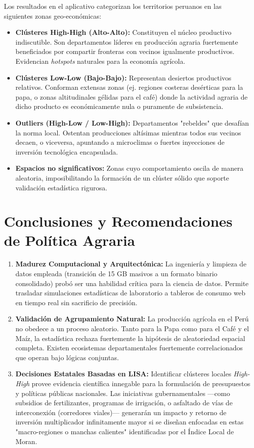 \documentclass[12pt,a4paper]{article}
\begin{document}
Los resultados en el aplicativo categorizan los territorios peruanos en las siguientes zonas geo-económicas:
\begin{itemize}
    \item \textbf{Clústeres High-High (Alto-Alto):} Constituyen el núcleo productivo indiscutible. Son departamentos líderes en producción agraria fuertemente beneficiados por compartir fronteras con vecinos igualmente productivos. Evidencian \textit{hotspots} naturales para la economía agrícola.
    \item \textbf{Clústeres Low-Low (Bajo-Bajo):} Representan desiertos productivos relativos. Conforman extensas zonas (ej. regiones costeras desérticas para la papa, o zonas altitudinales gélidas para el café) donde la actividad agraria de dicho producto es económicamente nula o puramente de subsistencia.
    \item \textbf{Outliers (High-Low / Low-High):} Departamentos "rebeldes" que desafían la norma local. Ostentan producciones altísimas mientras todos sus vecinos decaen, o viceversa, apuntando a microclimas o fuertes inyecciones de inversión tecnológica encapsulada.
    \item \textbf{Espacios no significativos:} Zonas cuyo comportamiento oscila de manera aleatoria, imposibilitando la formación de un clúster sólido que soporte validación estadística rigurosa.
\end{itemize}

\section{Conclusiones y Recomendaciones de Política Agraria}
\begin{enumerate}
    \item \textbf{Madurez Computacional y Arquitectónica:} La ingeniería y limpieza de datos empleada (transición de 15 GB masivos a un formato binario consolidado) probó ser una habilidad crítica para la ciencia de datos. Permite trasladar simulaciones estadísticas de laboratorio a tableros de consumo web en tiempo real sin sacrificio de precisión.
    \item \textbf{Validación de Agrupamiento Natural:} La producción agrícola en el Perú no obedece a un proceso aleatorio. Tanto para la Papa como para el Café y el Maíz, la estadística rechaza fuertemente la hipótesis de aleatoriedad espacial completa. Existen ecosistemas departamentales fuertemente correlacionados que operan bajo lógicas conjuntas.
    \item \textbf{Decisiones Estatales Basadas en LISA:} Identificar clústeres locales \textit{High-High} provee evidencia científica innegable para la formulación de presupuestos y políticas públicas nacionales. Las iniciativas gubernamentales —como subsidios de fertilizantes, programas de irrigación, o asfaltado de vías de interconexión (corredores viales)— generarán un impacto y retorno de inversión multiplicador infinitamente mayor si se diseñan enfocadas en estas "macro-regiones o manchas calientes" identificadas por el Índice Local de Moran.
\end{enumerate}
\end{document}
